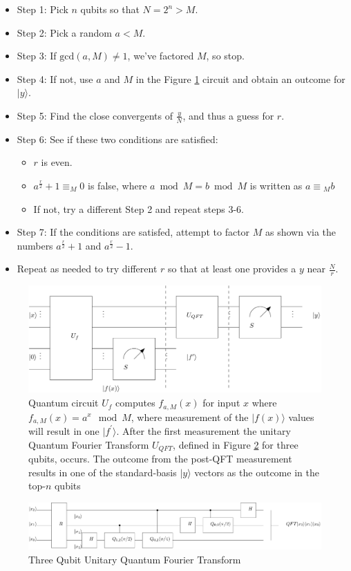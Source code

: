 \documentclass[main.tex]{subfiles}
\begin{document}
    \begin{itemize}
        \item Step 1: Pick $n$ qubits so that $N = 2^n > M$.
        \item Step 2: Pick a random $ a < M $.
        \item Step 3: If $\text{gcd}(a,M) \neq 1$, we've factored $M$, so stop.
        \item Step 4: If not, use $a$ and $M$ in the Figure \ref{fig:shorsCircuit} circuit and obtain an outcome for $|y\rangle$.
        \item Step 5: Find the close convergents of $\frac{y}{N}$, and thus a guess for $r$.
        \item Step 6: See if these two conditions are satisfied:
        \begin{itemize}
            \item $r$ is even.
            \item $a^{\frac{r}{2}} + 1 \equiv_M 0 $ is false, where $a \bmod M=b \bmod M$ is written as $a \equiv{ }_{M} b$
            \item If not, try a different Step 2 and repeat steps 3-6.
        \end{itemize}
        \item Step 7: If the conditions are satisfed, attempt to factor $M$ as shown via the numbers $a^{\frac{r}{2}} + 1$ and $a^{\frac{r}{2}} - 1$.
        \item Repeat as needed to try different $r$ so that at least one provides a $y$ near $\frac{N}{r}$.
    \end{itemize}

    \begin{figure}
        \centering
        \includegraphics[width=6in]{paper/figs/shorsCircuit.png}
            \caption{Quantum circuit $U_f$ computes $f_{a,M}(x)$ for input $x$ where $f_{a,M}(x)=a^x \mod M$, where measurement of the $|f(x)\rangle$ values will result in one $|f^{\prime} \rangle$. After the first measurement the unitary Quantum Fourier Transform $U_{QFT}$, defined in Figure \ref{fig:3qQFT} for three qubits, occurs. The outcome from the post-QFT measurement results in one of the standard-basis $|y\rangle$ vectors as the outcome in the top-$n$ qubits}
        \label{fig:shorsCircuit}
    \end{figure}
    
     \begin{figure}
        \centering
        \includegraphics[width=7in]{paper/figs/3qQFT.png}
            \caption{Three Qubit Unitary Quantum Fourier Transform}
        \label{fig:3qQFT}
    \end{figure}
    
    
    
\end{document}
